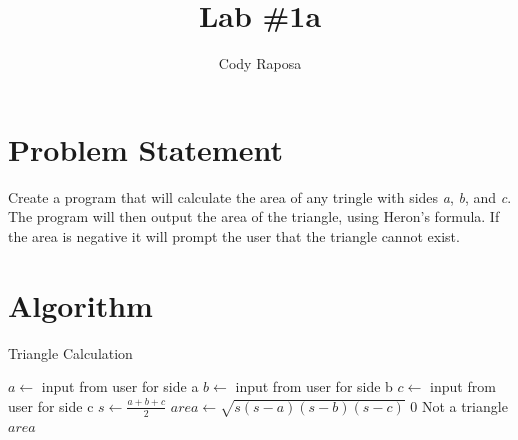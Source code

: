 \documentclass{article}
\title{Lab \#1a}
\author{Cody Raposa}
\affil{ELEC2850 Microcontrollers Using C Programming}
\begin{document}
\maketitle
\begin{flushleft}
  \section{Problem Statement}
  Create a program that will calculate the area of any tringle with sides \textit{a}, \textit{b}, and \textit{c}. The program will then output the area of the triangle, using Heron's formula. If the area is negative it will prompt the user that the triangle cannot exist.
  \section{Algorithm}
  \begin{algorithm}
    \caption{Triangle Calculation}\label{euclid}
    \begin{algorithmic}[1]
      \State $a \gets$ input from user for side a
      \State $b \gets$ input from user for side b
      \State $c \gets$ input from user for side c
      \State $s \gets \frac{a+b+c}{2}$
      \State $area \gets \sqrt{s(s-a)(s-b)(s-c)}$
       0 \Return Not a triangle
      \EndIf
      \State \Return $area$
    \end{algorithmic}
  \end{algorithm}
  \newpage

\end{flushleft}
\end{document}
